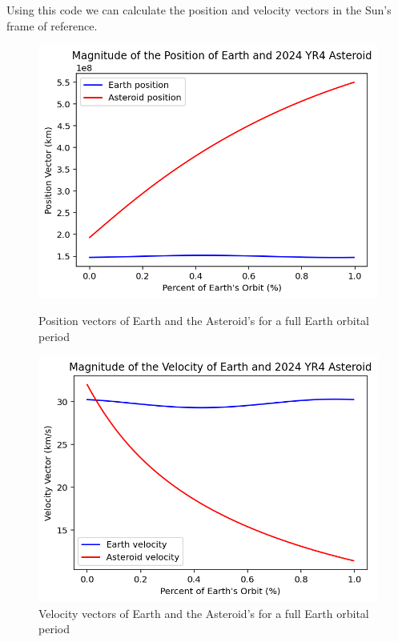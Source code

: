 \documentclass[a4paper, 12pt]{article}  %
\begin{document}
\noindent Using this code we can calculate the position and velocity vectors in the Sun's frame of reference. 

\begin{figure}[H]
    \centering
    \begin{minipage}{0.48\textwidth}
        \centering
        \includegraphics[width=\textwidth]{114-pos.png}
        \caption{Position vectors of Earth and the Asteroid's for a full Earth orbital period}
        \label{fig:pos}
    \end{minipage}
    \hfill
    \begin{minipage}{0.48\textwidth}
        \centering
        \includegraphics[width=\textwidth]{114-vel.png}
        \caption{Velocity vectors of Earth and the Asteroid's for a full Earth orbital period}
        \label{fig:vel}
    \end{minipage}
\end{figure}
\end{document}
